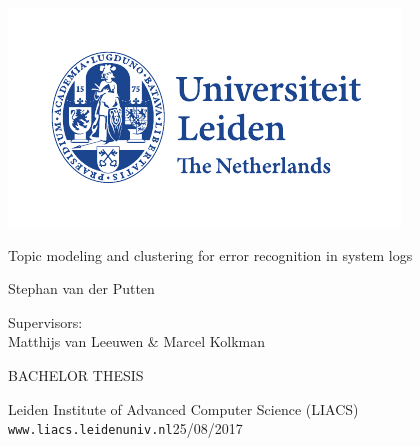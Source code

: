\thispagestyle{empty}

\includegraphics{logoleiden}


\vspace{-2.5cm}\hfill {}

\vspace{5cm}
\begin{Large}
\hfill Topic modeling and clustering for error recognition in system logs

\vspace*{14mm}

\hfill Stephan van der Putten
\end{Large}


\begin{large}

\vspace{2.8cm}
Supervisors:\\
Matthijs van Leeuwen \& Marcel Kolkman


\vspace*{2.8cm}

BACHELOR THESIS

\vspace*{5mm}
Leiden Institute of Advanced Computer Science (LIACS)\\
\texttt{www.liacs.leidenuniv.nl}\hfill 25/08/2017
\end{large}

